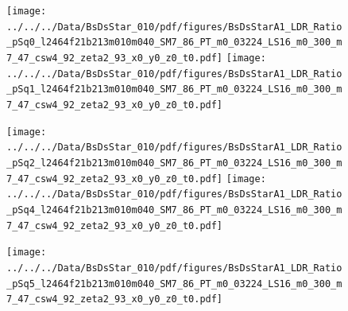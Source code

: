 \documentclass[a4paper,10pt]{article}
\begin{document}
\begin{figure}[p]
 \texttt{[image: ../../../Data/BsDsStar\_010/pdf/figures/BsDsStarA1\_LDR\_Ratio\_pSq0\_l2464f21b213m010m040\_SM7\_86\_PT\_m0\_03224\_LS16\_m0\_300\_m7\_47\_csw4\_92\_zeta2\_93\_x0\_y0\_z0\_t0.pdf]} 
 \texttt{[image: ../../../Data/BsDsStar\_010/pdf/figures/BsDsStarA1\_LDR\_Ratio\_pSq1\_l2464f21b213m010m040\_SM7\_86\_PT\_m0\_03224\_LS16\_m0\_300\_m7\_47\_csw4\_92\_zeta2\_93\_x0\_y0\_z0\_t0.pdf]} 
 \end{figure}
\clearpage
\begin{figure}[p]
 \texttt{[image: ../../../Data/BsDsStar\_010/pdf/figures/BsDsStarA1\_LDR\_Ratio\_pSq2\_l2464f21b213m010m040\_SM7\_86\_PT\_m0\_03224\_LS16\_m0\_300\_m7\_47\_csw4\_92\_zeta2\_93\_x0\_y0\_z0\_t0.pdf]} 
 \texttt{[image: ../../../Data/BsDsStar\_010/pdf/figures/BsDsStarA1\_LDR\_Ratio\_pSq4\_l2464f21b213m010m040\_SM7\_86\_PT\_m0\_03224\_LS16\_m0\_300\_m7\_47\_csw4\_92\_zeta2\_93\_x0\_y0\_z0\_t0.pdf]} 
 \end{figure}
\begin{figure}[p]
 \texttt{[image: ../../../Data/BsDsStar\_010/pdf/figures/BsDsStarA1\_LDR\_Ratio\_pSq5\_l2464f21b213m010m040\_SM7\_86\_PT\_m0\_03224\_LS16\_m0\_300\_m7\_47\_csw4\_92\_zeta2\_93\_x0\_y0\_z0\_t0.pdf]} 
 \end{figure}
\clearpage
\end{document}
